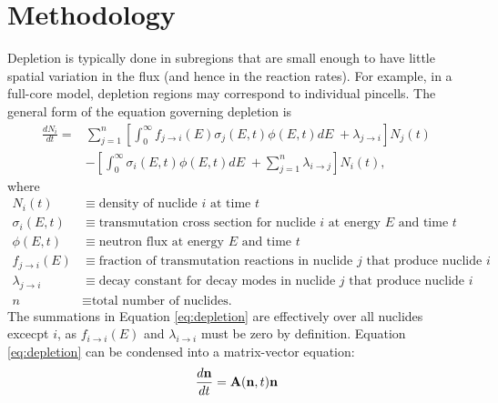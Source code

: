 \section{Methodology}
    \label{sec:methods}
    Depletion is typically done in subregions that are small enough to have
    little spatial variation in the flux (and hence in the reaction rates). For
    example, in a full-core model, depletion regions may correspond to
    individual pincells. The general form of the equation governing depletion is
    \begin{equation}
      \label{eq:depletion}
      \begin{split}
        \frac{dN_i}{dt} = &\sum\limits_{j=1}^n \left[ \int_0^\infty 
        f_{j \rightarrow i}(E) \sigma_j (E, t) \phi(E,t) dE \;+ \lambda_{j\rightarrow i}
        \right] N_j(t) \\ &- \left [\int_0^\infty \sigma_i (E,t) \phi(E,t) dE \; +
        \sum\limits_{j=1}^n \lambda_{i\rightarrow j} \right ] N_i(t),
      \end{split}
    \end{equation}
    where
    \begin{equation*}
      \begin{split}
        N_i(t) &\equiv \text{density of nuclide $i$ at time $t$} \\
        \sigma_i(E,t) &\equiv \text{transmutation cross section for nuclide $i$ at energy $E$ and time $t$} \\
        \phi(E,t) &\equiv \text{neutron flux at energy $E$ and time $t$} \\
        f_{j \rightarrow i}(E) &\equiv \text{fraction of transmutation reactions in nuclide $j$ that produce nuclide $i$} \\
        \lambda_{j \rightarrow i} &\equiv \text{decay constant for decay modes in nuclide $j$ that produce nuclide $i$} \\
        n &\equiv \text{total number of nuclides.}
      \end{split}
    \end{equation*}
    The summations in Equation \ref{eq:depletion} are effectively over all
    nuclides excecpt $i$, as $f_{i \rightarrow i}(E)$ and $\lambda_{i \rightarrow i}$ must
    be zero by definition. Equation \ref{eq:depletion} can be condensed into a
    matrix-vector equation:
    \begin{equation}
      \label{eq:depletion-matrix-t}
      \frac{d\mathbf{n}}{dt} = \mathbf{A}(\mathbf{n},t)\mathbf{n}
    \end{equation}
